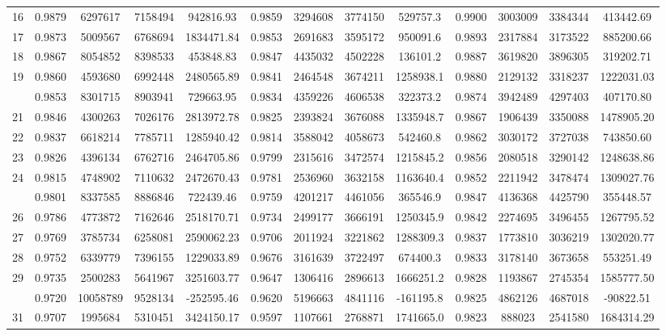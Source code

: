 \documentclass[
  12pt,
]{article}
\begin{document}
\begin{longtable}[t]{lcccccccccccc}
16 & 0.9879 & 6297617 & 7158494 & 942816.93 & 0.9859 & 3294608 & 3774150 & 529757.3 & 0.9900 & 3003009 & 3384344 & 413442.69\\
17 & 0.9873 & 5009567 & 6768694 & 1834471.84 & 0.9853 & 2691683 & 3595172 & 950091.6 & 0.9893 & 2317884 & 3173522 & 885200.66\\
18 & 0.9867 & 8054852 & 8398533 & 453848.83 & 0.9847 & 4435032 & 4502228 & 136101.2 & 0.9887 & 3619820 & 3896305 & 319202.71\\
19 & 0.9860 & 4593680 & 6992448 & 2480565.89 & 0.9841 & 2464548 & 3674211 & 1258938.1 & 0.9880 & 2129132 & 3318237 & 1222031.03\\
\addlinespace
20 & 0.9853 & 8301715 & 8903941 & 729663.95 & 0.9834 & 4359226 & 4606538 & 322373.2 & 0.9874 & 3942489 & 4297403 & 407170.80\\
21 & 0.9846 & 4300263 & 7026176 & 2813972.78 & 0.9825 & 2393824 & 3676088 & 1335948.7 & 0.9867 & 1906439 & 3350088 & 1478905.20\\
22 & 0.9837 & 6618214 & 7785711 & 1285940.42 & 0.9814 & 3588042 & 4058673 & 542460.8 & 0.9862 & 3030172 & 3727038 & 743850.60\\
23 & 0.9826 & 4396134 & 6762716 & 2464705.86 & 0.9799 & 2315616 & 3472574 & 1215845.2 & 0.9856 & 2080518 & 3290142 & 1248638.86\\
24 & 0.9815 & 4748902 & 7110632 & 2472670.43 & 0.9781 & 2536960 & 3632158 & 1163640.4 & 0.9852 & 2211942 & 3478474 & 1309027.76\\
\addlinespace
25 & 0.9801 & 8337585 & 8886846 & 722439.46 & 0.9759 & 4201217 & 4461056 & 365546.9 & 0.9847 & 4136368 & 4425790 & 355448.57\\
26 & 0.9786 & 4773872 & 7162646 & 2518170.71 & 0.9734 & 2499177 & 3666191 & 1250345.9 & 0.9842 & 2274695 & 3496455 & 1267795.52\\
27 & 0.9769 & 3785734 & 6258081 & 2590062.23 & 0.9706 & 2011924 & 3221862 & 1288309.3 & 0.9837 & 1773810 & 3036219 & 1302020.77\\
28 & 0.9752 & 6339779 & 7396155 & 1229033.89 & 0.9676 & 3161639 & 3722497 & 674400.3 & 0.9833 & 3178140 & 3673658 & 553251.49\\
29 & 0.9735 & 2500283 & 5641967 & 3251603.77 & 0.9647 & 1306416 & 2896613 & 1666251.2 & 0.9828 & 1193867 & 2745354 & 1585777.50\\
\addlinespace
30 & 0.9720 & 10058789 & 9528134 & -252595.46 & 0.9620 & 5196663 & 4841116 & -161195.8 & 0.9825 & 4862126 & 4687018 & -90822.51\\
31 & 0.9707 & 1995684 & 5310451 & 3424150.17 & 0.9597 & 1107661 & 2768871 & 1741665.0 & 0.9823 & 888023 & 2541580 & 1684314.29\\

\end{longtable}
\end{document}
